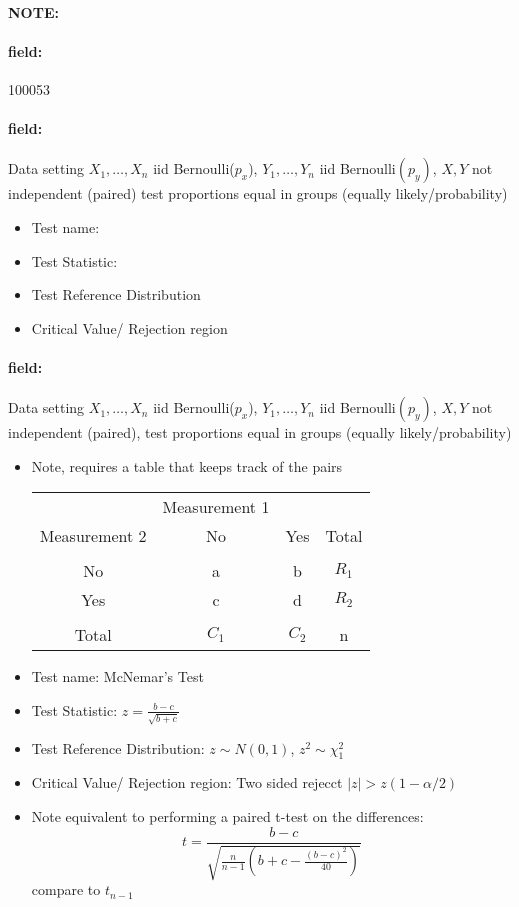 \documentclass[12pt]{article}
\newenvironment{note}{\paragraph{NOTE:}}{}
\newenvironment{field}{\paragraph{field:}}{}
\begin{document}
\begin{note} \begin{field} \tiny 100053 \end{field}
 \begin{field}
  Data setting $X_1, \ldots , X_n$ iid Bernoulli($p_x$), $Y_1, \ldots, Y_n$ iid Bernoulli$(p_y)$, $X,Y$ not independent (paired) test proportions equal in groups (equally likely/probability)
  \begin{itemize}
   \item Test name:
   \item Test Statistic:
   \item Test Reference Distribution
   \item Critical Value/ Rejection region
  \end{itemize}
 \end{field}
 \begin{field}
  Data setting $X_1, \ldots , X_n$ iid Bernoulli($p_x$), $Y_1, \ldots, Y_n$ iid Bernoulli$(p_y)$, $X,Y$ not independent (paired), test proportions equal in groups (equally likely/probability)
  \begin{itemize}

   \item Note, requires a table that keeps track of the pairs
         \begin{tabular}{|c|c c|c|}
                        & Measurement 1 &       &       \\
          Measurement 2 & No            & Yes   & Total \\
          \hline                                        \\
          No            & a             & b     & $R_1$ \\
          Yes           & c             & d     & $R_2$ \\
          \hline                                        \\
          Total         & $C_1$         & $C_2$ & n     \\
          \hline
         \end{tabular}
   \item Test name: McNemar's Test
   \item Test Statistic: $z = \frac{b-c}{\sqrt{b+c}}$
   \item Test Reference Distribution: $z \sim N(0,1)$, $z^2 \sim \chi_1^2$
   \item Critical Value/ Rejection region: Two sided rejecct $|z| > z(1 - \alpha/2)$
   \item Note equivalent to performing a paired t-test on the differences:
         $$ t = \frac{b-c}{\sqrt{\frac{n}{n-1}(b + c - \frac{(b-c)^2}{40})}} $$ compare to $t_{n-1}$
  \end{itemize}
 \end{field}
\end{note}
\end{document}
